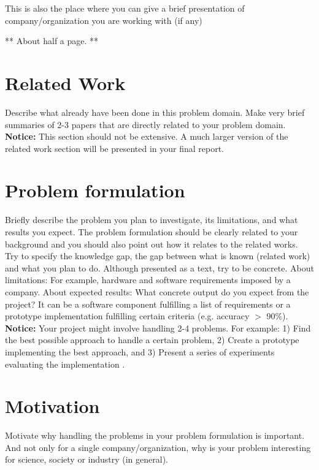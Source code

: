 \documentclass[12pt]{article}
\begin{document}
This is also the place where you can give a brief presentation of company/organization you are working with (if any)


** About half a page. **

\section*{Related Work}
Describe what already have been done in this problem domain. Make very brief summaries of 2-3 papers that 
are directly related to your problem domain. \\

\noindent
\textbf{Notice:}  This section should not be extensive. A much larger version of the related work section will be presented in your final report.


\section*{Problem formulation}
Briefly describe the problem you plan to investigate, its limitations, and what results you expect. The problem formulation should be clearly related to your background and you should also point out how it relates to the related works. Try to  specify the knowledge gap, the gap between what is known (related work) and what you plan to do. Although presented as a text, try to be concrete.  About limitations: For example, hardware and software requirements imposed by a company. About expected results: What concrete output do you expect from the project? It can be a  software component fulfilling a list of requirements or a prototype implementation fulfilling certain criteria (e.g. accuracy $>$ 90\%). \\

\noindent
\textbf{Notice:}  Your project might involve handling 2-4 problems. For example: 1) Find the best possible approach to handle a certain problem, 2) Create a prototype implementing the best approach, and 3) Present a series of experiments evaluating the implementation . 


\section*{Motivation}
Motivate why handling the  problems in your problem formulation is important. And not only for a single company/organization,  why is your problem interesting for science, society or industry (in general). \\
\end{document}
